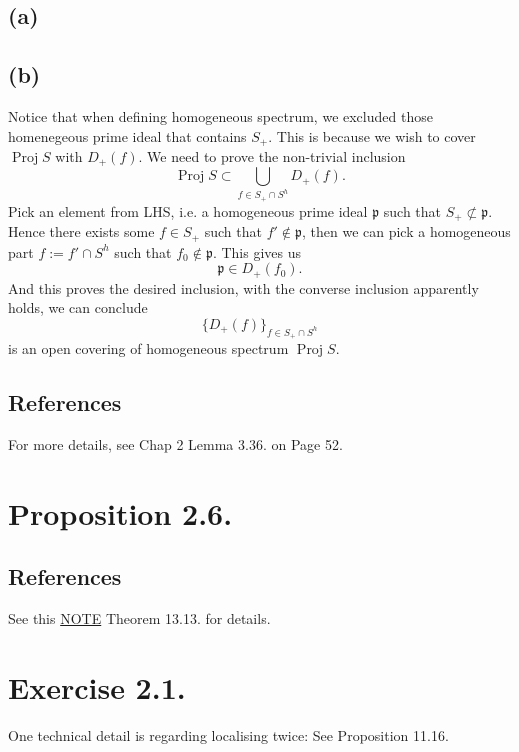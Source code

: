 \subsection{(a)}

\subsection{(b)}

Notice that when defining homogeneous spectrum, we excluded those homenegeous prime ideal that contains $S_+$. This is because we wish to cover $\operatorname{Proj}S$ with $D_+(f)$. We need to prove the non-trivial inclusion 
\[\operatorname{Proj}S\subset \bigcup_{f\in S_+\cap S^h}D_+(f).\]
Pick an element from LHS, i.e. a homogeneous prime ideal $\mathfrak p$ such that $S_+\not\subset \mathfrak p$. Hence there exists some $f\in S_+$ such that $f'\notin \mathfrak p$, then we can pick a homogeneous part $f:=f'\cap S^h$ such that $f_0\notin \mathfrak p$. This gives us 
\[\mathfrak p\in D_+(f_0).\]
And this proves the desired inclusion, with the converse inclusion apparently holds, we can conclude 
\[\{D_+(f)\}_{f\in S_+\cap S^h}\] is an open covering of homogeneous spectrum $\operatorname{Proj}S$.

\subsection{References}

For more details, see \cite{qing2006algebraic} Chap 2 Lemma 3.36. on Page 52.

\section{Proposition 2.6.}

\subsection{References}

See this \href{https://math.mit.edu/~mckernan/Teaching/09-10/Autumn/18.725/l_13.pdf}{NOTE} Theorem 13.13. for details.

\section{Exercise 2.1.}\label{Hart Ex 2.1.}

One technical detail is regarding localising twice: See \cite{altman2013term} Proposition 11.16.

